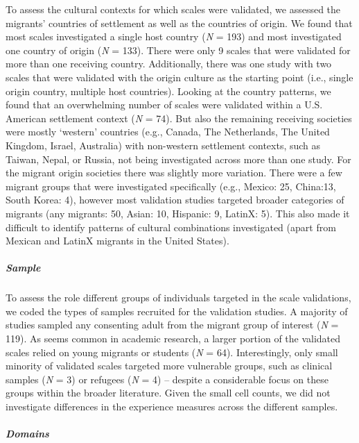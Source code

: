 To assess the cultural contexts for which scales were validated, we
assessed the migrants' countries of settlement as well as the countries
of origin. We found that most scales investigated a single host country
(\textit{N} = 193) and most investigated one country of origin
(\textit{N} = 133). There were only 9 scales that were validated for
more than one receiving country. Additionally, there was one study with
two scales that were validated with the origin culture as the starting
point (i.e., single origin country, multiple host countries). Looking at
the country patterns, we found that an overwhelming number of scales
were validated within a U.S. American settlement context (\textit{N} =
74). But also the remaining receiving societies were mostly `western'
countries (e.g., Canada, The Netherlands, The United Kingdom, Israel,
Australia) with non-western settlement contexts, such as Taiwan, Nepal,
or Russia, not being investigated across more than one study. For the
migrant origin societies there was slightly more variation. There were a
few migrant groups that were investigated specifically (e.g., Mexico:
25, China:13, South Korea: 4), however most validation studies targeted
broader categories of migrants (any migrants: 50, Asian: 10, Hispanic:
9, LatinX: 5). This also made it difficult to identify patterns of
cultural combinations investigated (apart from Mexican and LatinX
migrants in the United States).

\subparagraph{Sample}

To assess the role different groups of individuals targeted in the scale
validations, we coded the types of samples recruited for the validation
studies. A majority of studies sampled any consenting adult from the
migrant group of interest (\textit{N} = 119). As seems common in
academic research, a larger portion of the validated scales relied on
young migrants or students (\textit{N} = 64). Interestingly, only small
minority of validated scales targeted more vulnerable groups, such as
clinical samples (\textit{N} = 3) or refugees (\textit{N} = 4) --
despite a considerable focus on these groups within the broader
literature. Given the small cell counts, we did not investigate
differences in the experience measures across the different samples.

\subparagraph{Domains}


